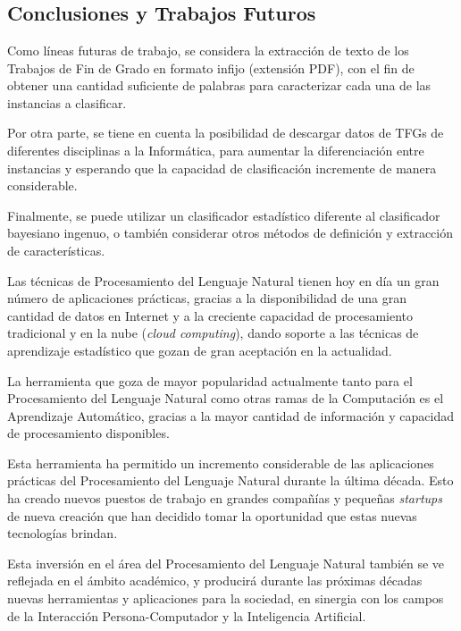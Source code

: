 \chapter{\ChapterFour{}}

\section{Conclusiones y Trabajos Futuros}

Como líneas futuras de trabajo, se considera la extracción de texto de los Trabajos de Fin de Grado en formato infijo (extensión PDF), con el fin de obtener una cantidad suficiente de palabras para caracterizar cada una de las instancias a clasificar.

Por otra parte, se tiene en cuenta la posibilidad de descargar datos de TFGs de diferentes disciplinas a la Informática, para aumentar la diferenciación entre instancias y esperando que la capacidad de clasificación incremente de manera considerable.

Finalmente, se puede utilizar un clasificador estadístico diferente al clasificador bayesiano ingenuo, o también considerar otros métodos de definición y extracción de características.

\vskip 20pt

Las técnicas de Procesamiento del Lenguaje Natural tienen hoy en día un gran número de aplicaciones prácticas, gracias a la disponibilidad de una gran cantidad de datos en Internet y a la creciente capacidad de procesamiento tradicional y en la nube (\textit{cloud computing}), dando soporte a las técnicas de aprendizaje estadístico que gozan de gran aceptación en la actualidad.

La herramienta que goza de mayor popularidad actualmente tanto para el Procesamiento del Lenguaje Natural como otras ramas de la Computación es el Aprendizaje Automático, gracias a la mayor cantidad de información y capacidad de procesamiento disponibles.

Esta herramienta ha permitido un incremento considerable de las aplicaciones prácticas del Procesamiento del Lenguaje Natural durante la última década. Esto ha creado nuevos puestos de trabajo en grandes compañías y pequeñas \textit{startups} de nueva creación que han decidido tomar la oportunidad que estas nuevas tecnologías brindan.

Esta inversión en el área del Procesamiento del Lenguaje Natural también se ve reflejada en el ámbito académico, y producirá durante las próximas décadas nuevas herramientas y aplicaciones para la sociedad, en sinergia con los campos de la Interacción Persona-Computador y la Inteligencia Artificial.

